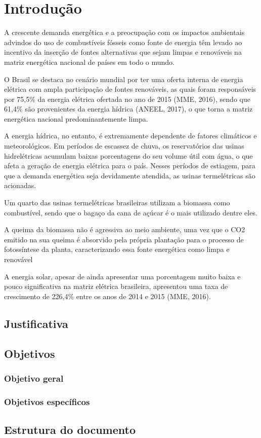 \chapter[Introdução]{Introdução}


A crescente demanda energética e a preocupação com os impactos ambientais advindos do uso de combustíveis fósseis como fonte de energia têm levado ao incentivo da inserção de fontes alternativas que sejam limpas e renováveis na matriz energética nacional de países em todo o mundo. 

O Brasil se destaca no cenário mundial por ter uma oferta interna de energia elétrica com ampla participação de fontes renováveis, as quais foram responsáveis por 75,5\% da energia elétrica ofertada no ano de 2015 (MME, 2016), sendo que 61,4\% são provenientes da energia hídrica (ANEEL, 2017), o que torna a matriz energética nacional predominantemente limpa.

A energia hídrica, no entanto, é extremamente dependente de fatores climáticos e meteorológicos. Em períodos de escassez de chuva, os reservatórios das usinas hidrelétricas acumulam baixas porcentagens do seu volume útil com água, o que afeta a geração de energia elétrica para o país. Nesses períodos de estiagem, para que a demanda energética seja devidamente atendida, as usinas termelétricas são acionadas.
 
Um quarto das usinas termelétricas brasileiras utilizam a biomassa como combustível, sendo que o bagaço da cana de açúcar é o mais utilizado dentre eles. 

A queima da biomassa não é agressiva ao meio ambiente, uma vez que o CO2 emitido na sua queima é absorvido pela própria plantação para o processo de fotossíntese da planta, caracterizando essa fonte energética como limpa e renovável

A energia solar, apesar de ainda apresentar uma porcentagem muito baixa e pouco significativa na matriz elétrica brasileira, apresentou uma taxa de crescimento de 226,4\% entre os anos de 2014 e 2015 (MME, 2016).

\section{Justificativa}

\section{Objetivos}
\subsection{Objetivo geral}

\subsection{Objetivos específicos}

\section{Estrutura do documento}

